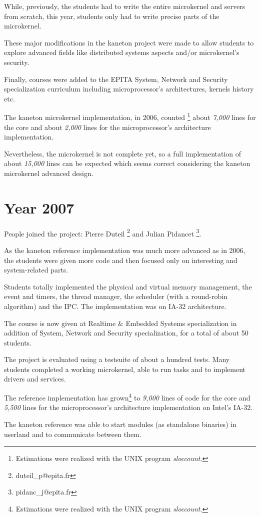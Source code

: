 While, previously, the students had to write the entire microkernel
and servers from scratch, this year, students only had to write precise
parts of the microkernel.

These major modifications in the kaneton project were made to
allow students to explore advanced fields like distributed systems
aspects and/or microkernel's security.

Finally, courses were added to the EPITA System, Network and Security
specialization curriculum including microprocessor's architectures,
kernels history etc.

The kaneton microkernel implementation, in 2006, counted
\footnote{Estimations were realized with the UNIX program \textit{sloccount}.}
about \textit{7,000} lines for the core and about \textit{2,000} lines for the
microprocessor's architecture implementation.

Nevertheless, the microkernel is not complete yet, so a full implementation
of about \textit{15,000} lines can be expected which seems correct
considering the kaneton microkernel advanced design.

%
%

\section{Year 2007}

People joined the project:
Pierre Duteil
  \footnote{duteil\_p@epita.fr} and
Julian Pidancet
  \footnote{pidanc\_j@epita.fr}.

As the kaneton reference implementation was much more advanced as in
2006, the students were given more code and then focused only on
interesting and system-related parts.

Students totally implemented the physical and virtual memory
management, the event and timers, the thread manager, the scheduler
(with a round-robin algorithm) and the IPC. The implementation was on
IA-32 architecture.

The course is now given at Realtime \& Embedded Systems specialization
in addition of System, Network and Security specialization, for a
total of about 50 students.

The project is evaluated using a testsuite of about a hundred
tests. Many students completed a working microkernel, able to run tasks
and to implement drivers and services.

The reference implementation has grown\footnote{Estimations were
realized with the UNIX program \textit{sloccount}.} to \textit{9,000}
lines of code for the core and \textit{5,500} lines for the
microprocessor's architecture implementation on Intel's IA-32.

The kaneton reference was able to start modules (as standalone
binaries) in userland and to communicate between them.
